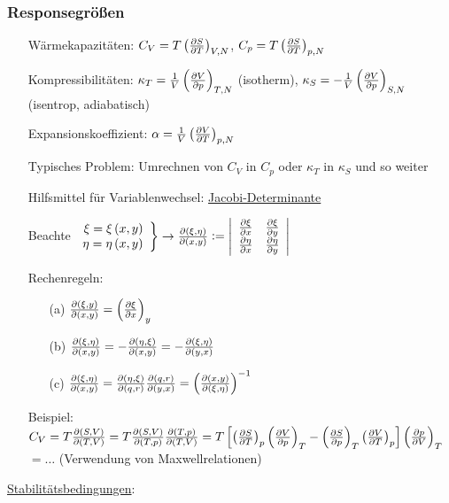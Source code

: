 \subsubsection{Responsegrößen}
\begin{itemize}[align=left]
  \item[Wärmekapazitäten:] $C_V = T\pdv{S}{T}{V,N}$, $C_p = T\pdv{S}{T}{p,N}$
  \item[Kompressibilitäten:] $\kappa_T = \frac{1}{V}\pdv{V}{p}{T,N}$ (isotherm), $\kappa_S = -\frac{1}{V}\pdv{V}{p}{S,N}$ (isentrop, \glqq adiabatisch\grqq)
  \item[Expansionskoeffizient:] $\alpha = \frac{1}{V}\pdv{V}{T}{p,N}$
  \item[Typisches Problem:] Umrechnen von $C_V$ in $C_p$ oder $\kappa_T$ in $\kappa_S$ und so weiter
  \item[Hilfsmittel für Variablenwechsel:] \uline{Jacobi-Determinante}
  \item[Beachte] $\left.\begin{array}{r} \xi = \xi\norBra{x,y}\\ \eta = \eta\norBra{x,y}\end{array} \right\} \rightarrow \ppv{\norBra{\xi,\eta}}{\norBra{x,y}} \mDef \verBra{\begin{array}{c c}\ppv{\xi}{x} & \ppv{\xi}{y}\\ \ppv{\eta}{x} & \ppv{\eta}{y} \end{array}}$
  \item[Rechenregeln:] \begin{itemize}[align=left]
    \item[(a)] $\ppv{\norBra{\xi,y}}{\norBra{x,y}} = \pdv{\xi}{x}{y}$
    \item[(b)] $\ppv{\norBra{\xi,\eta}}{\norBra{x,y}} = -\ppv{\norBra{\eta,\xi}}{\norBra{x,y}} = -\ppv{\norBra{\xi,\eta}}{\norBra{y,x}}$
    \item[(c)] $\ppv{\norBra{\xi,\eta}}{\norBra{x,y}} = \ppv{\norBra{\eta,\xi}}{\norBra{q,r}} \ppv{\norBra{q,r}}{\norBra{y,x}} = \norBra{\ppv{\norBra{x,y}}{\norBra{\xi,\eta}}}^{-1}$
  \end{itemize}
  \item[Beispiel:] $C_V = T  \ppv{\norBra{S,V}}{\norBra{T,V}} = T \ppv{\norBra{S,V}}{\norBra{T,p}}\ppv{\norBra{T,p}}{\norBra{T,V}} = T\edgBra{\pdv{S}{T}{p}\pdv{V}{p}{T} - \pdv{S}{p}{T}\pdv{V}{T}{p}}\pdv{p}{V}{T}$\\ $=\dots$ (Verwendung von Maxwellrelationen)
\end{itemize}
\uline{Stabilitätsbedingungen}:

